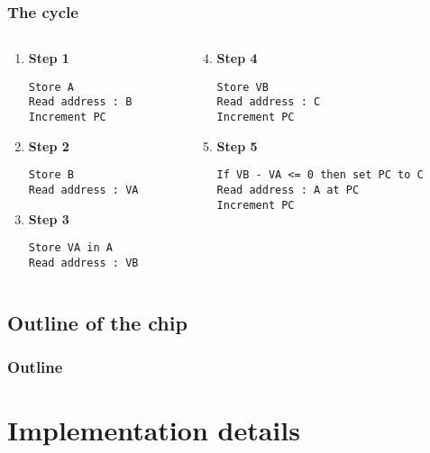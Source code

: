 \documentclass{beamer}
\begin{document}
\begin{frame}[fragile]
    \frametitle{The cycle}
\begin{columns}[t]
	\begin{column}[T]{4cm}
    \begin{enumerate}
      \setcounter{enumi}{0}
        \item \textbf{Step 1}
          \begin{verbatim}
Store A
Read address : B
Increment PC
          \end{verbatim}
        \item \textbf{Step 2}
          \begin{verbatim}
Store B
Read address : VA
          \end{verbatim}
        \item \textbf{Step 3}
	        \begin{verbatim}
Store VA in A
Read address : VB
          \end{verbatim}
  	\end{enumerate}
	\end{column}
	\begin{column}[T]{7cm}
  	\begin{enumerate}
  	  \setcounter{enumi}{3}
  	    \item \textbf{Step 4}
  	      \begin{verbatim}
Store VB
Read address : C
Increment PC
  	      \end{verbatim}
  	    \item \textbf{Step 5}
  	      \begin{verbatim}
If VB - VA <= 0 then set PC to C
Read address : A at PC
Increment PC
  	      \end{verbatim}
  	\end{enumerate}
	\end{column}
\end{columns}

\end{frame}

\subsection{Outline of the chip}
\begin{frame}
    \frametitle{Outline}
    \begin{center}
    
    \end{center}
\end{frame}

\section{Implementation details}
\end{document}
